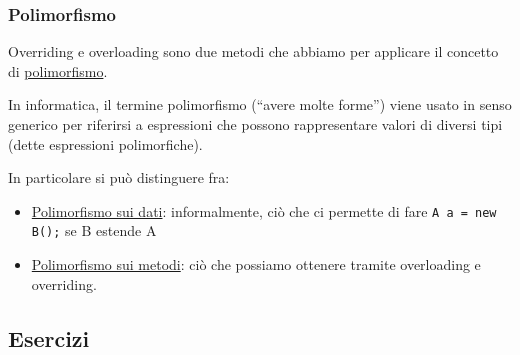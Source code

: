 \subsubsection{Polimorfismo}
Overriding e overloading sono due metodi che abbiamo per applicare il concetto di \underline{polimorfismo}.
\begin{tcolorbox}
	In informatica, il termine polimorfismo (“avere molte forme”) viene usato in senso generico per riferirsi a espressioni  che possono rappresentare valori di diversi tipi  (dette espressioni polimorfiche).
\end{tcolorbox}

In particolare si può distinguere fra:
\begin{itemize}
	\item \underline{Polimorfismo sui dati}: informalmente, ciò che ci permette di fare \verb|A a = new B();| se B estende A
	\item \underline{Polimorfismo sui metodi}: ciò che possiamo ottenere tramite overloading e overriding.
\end{itemize}

\subsection{Esercizi}

